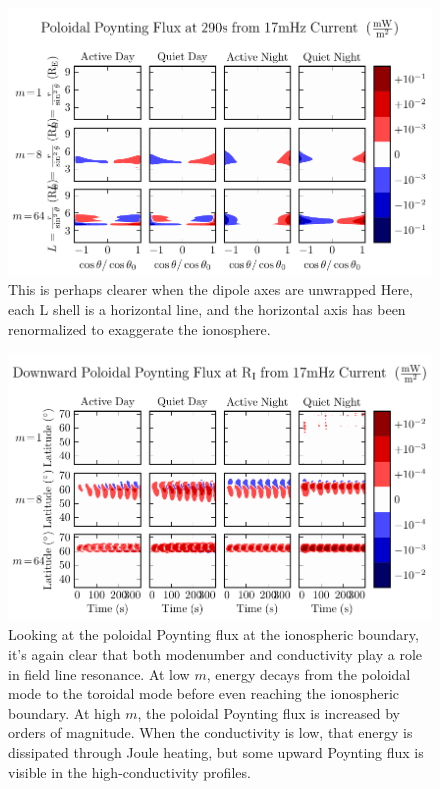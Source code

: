 \documentclass{article}
\begin{document}
\begin{figure}[H]
  \includegraphics{SP_unwrapped.pdf}
  \caption{This is perhaps clearer when the dipole axes are unwrapped Here, each L shell is a horizontal line, and the horizontal axis has been renormalized to exaggerate the ionosphere. }
  \label{fig_SP_unwrapped}
\end{figure}

\begin{figure}[H]
  \includegraphics{SP_RI.pdf}
  \caption{Looking at the poloidal Poynting flux at the ionospheric boundary, it's again clear that both modenumber and conductivity play a role in field line resonance. At low $m$, energy decays from the poloidal mode to the toroidal mode before even reaching the ionospheric boundary. At high $m$, the poloidal Poynting flux is increased by orders of magnitude. When the conductivity is low, that energy is dissipated through Joule heating, but some upward Poynting flux is visible in the high-conductivity profiles.}
  \label{fig_SP_RI}
\end{figure}
\end{document}
